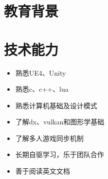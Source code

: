 \documentclass{resume}
\begin{document}



\section{教育背景}

\section{技术能力}
\begin{itemize}[parsep=0.2ex]
  \item 熟悉UE4、Unity
  \item 熟悉c、c++、lua
  \item 熟悉计算机基础及设计模式
  \item 了解dx、vulkan和图形学基础
  \item 了解多人游戏同步机制
  \item 长期自驱学习，乐于团队合作
  \item 善于阅读英文文档
\end{itemize}

\end{document}

